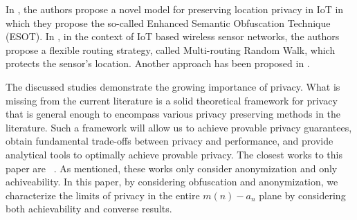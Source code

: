 In \cite{5ullah2016novel}, the authors propose a novel model for preserving location privacy in IoT in which they propose the so-called Enhanced Semantic Obfuscation Technique (ESOT).
In \cite{7zhou2012preserving}, in the context of IoT based wireless sensor networks, the authors propose a flexible routing strategy, called Multi-routing Random Walk, which protects the sensor's location. Another approach has been proposed in \cite{6sathishkumar2016enhanced}.

The discussed studies demonstrate the growing importance of privacy. What is missing from the current literature is a solid theoretical framework for privacy that is general enough to encompass various privacy preserving methods in the literature. Such a framework will allow us to achieve provable privacy guarantees, obtain fundamental trade-offs between privacy and performance, and provide analytical tools to optimally achieve provable privacy.   The closest works to this paper are ~\cite{montazeri2016defining, Mont1610Achieving,tifs2016,sit2017,ciss2017}. As mentioned, these works only consider anonymization and only achiveability. In this paper, by considering obfuscation and anonymization, we characterize the limits of privacy in the entire $m(n)-a_n$ plane by considering both achievability and converse results.


























